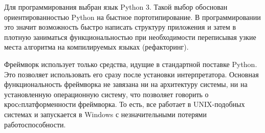 Для программирования выбран язык Python 3.
Такой выбор обоснован ориентированностью Python на быстное 
портотипирование.
В программировании это значит возможность быстро написать 
структуру приложения и затем в плотную заниматься функциональностью
при необходимости переписывая узкие места алгоритма на 
компилируемых языках (рефакторинг).

Фреймворк использует только средства, идущие в стандартной 
поставке Python. Это позволяет использовать его сразу 
после установки интерпретатора. Основная функциональность 
фреймворка не завязана ни на архитектуру системы, ни 
на установленную операционную систему, что позволяет 
говорить о кросcплатформенности фреймворка. То есть, 
все работает в UNIX-подобных системах и запускается в 
Windows с незначительными потерями работоспособности.
